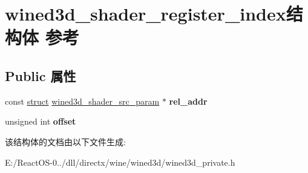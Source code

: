 \hypertarget{structwined3d__shader__register__index}{}\section{wined3d\+\_\+shader\+\_\+register\+\_\+index结构体 参考}
\label{structwined3d__shader__register__index}
\subsection*{Public 属性}
\begin{DoxyCompactItemize}
\item 
\mbox{\label{structwined3d__shader__register__index_ab4a4fed57026298fba6f077920ff9ec9}} 
const \hyperlink{interfacestruct}{struct} \hyperlink{structwined3d__shader__src__param}{wined3d\+\_\+shader\+\_\+src\+\_\+param} $\ast$ {\bfseries rel\+\_\+addr}
\item 
\mbox{\label{structwined3d__shader__register__index_afa0413e7465447f115117495daaf69b3}} 
unsigned int {\bfseries offset}
\end{DoxyCompactItemize}


该结构体的文档由以下文件生成\+:\begin{DoxyCompactItemize}
\item 
E\+:/\+React\+O\+S-\/0../dll/directx/wine/wined3d/wined3d\+\_\+private.\+h\end{DoxyCompactItemize}
